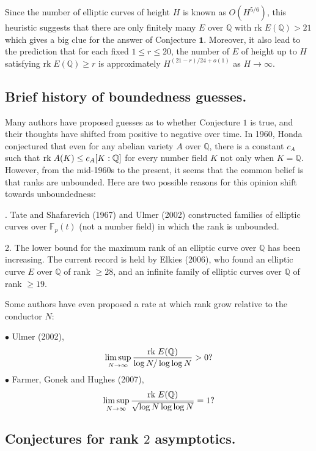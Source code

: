 \documentclass[12pt,reqno]{amsart}
\numberwithin{equation}{section}
\def\Q{{\mathbb Q}}
\def\F{{\mathbb F}}
\begin{document}
Since the number of elliptic curves of height $H$ is known as $O(H^{5/6})$, this heuristic suggests that there are only finitely many $E$ over $\Q$ with $\text{rk} \; E(\Q) > 21$ which gives a big clue for the answer of Conjecture $\mathbf{1}$. Moreover, it also lead to the prediction that for each fixed $ 1 \le r \le 20$, the number of $E$ of height up to $H$ satisfying $\text{rk} \; E(\Q) \ge r$ is approximately $H^{(21-r)/24 + o(1)}$ as $H \to \infty$.

\subsection{Brief history of boundedness guesses.}

Many authors have proposed guesses as to whether Conjecture $1$ is true, and their thoughts have shifted from positive to negative over time. In 1960, Honda conjectured that even for any abelian variety $A$ over $\Q$, there is a constant $c_A$ such that ${\rm rk }\; A(K) \le c_A[K:\Q]$ for every number field $K$ not only when $K = \Q$. However, from the mid-1960s to the present, it seems that the common belief is that ranks are unbounded. Here are two possible reasons for this opinion shift towards unboundedness:

. Tate and Shafarevich (1967) and Ulmer (2002) constructed families of elliptic curves over $\F_p(t)$ (not a number field) in which the rank is unbounded.

 2. The lower bound for the maximum rank of an elliptic curve over $\Q$ has been increasing. The current record is held by Elkies (2006), who found an elliptic curve $E$ over $\Q$ of rank $\ge 28$, and an infinite family of elliptic curves over $\Q$ of rank $\ge 19$.

\smallskip

Some authors have even proposed a rate at which rank grow relative to the conductor $N$:

\indent $\bullet$ Ulmer (2002),
$$
\limsup_{N \to \infty} \frac{ {\rm rk }\; E(\Q) } { \log N/ \log \log N} > 0?
$$
\indent $\bullet$ Farmer, Gonek and Hughes (2007),
$$
\limsup_{N \to \infty} \frac{ {\rm rk }\; E(\Q) } { \sqrt{\log N \log \log N}} = 1?
$$

\vspace{2mm}

\subsection{Conjectures for rank $2$ asymptotics.}
\end{document}
